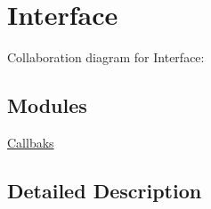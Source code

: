 \hypertarget{group___i_r_c_interface}{}\section{Interface}
\label{group___i_r_c_interface}
Collaboration diagram for Interface\+:
\subsection*{Modules}
\begin{DoxyCompactItemize}
\item 
\hyperlink{group___i_r_c_interface_callbacks}{Callbaks}
\end{DoxyCompactItemize}


\subsection{Detailed Description}
